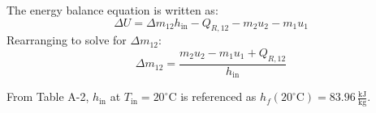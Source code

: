 The energy balance equation is written as:  
\[
\Delta U = \Delta m_{12} h_{\text{in}} - Q_{R,12} - m_2 u_2 - m_1 u_1
\]  
Rearranging to solve for \( \Delta m_{12} \):  
\[
\Delta m_{12} = \frac{m_2 u_2 - m_1 u_1 + Q_{R,12}}{h_{\text{in}}}
\]  

From Table A-2, \( h_{\text{in}} \) at \( T_{\text{in}} = 20^\circ\text{C} \) is referenced as \( h_f(20^\circ\text{C}) = 83.96 \, \frac{\text{kJ}}{\text{kg}} \).